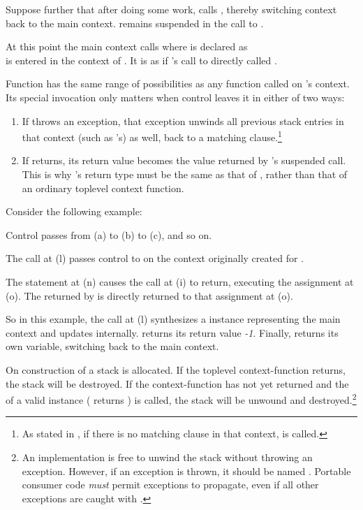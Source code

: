 Suppose further that after doing some work,  calls ,
thereby switching context back to the main context.  remains
suspended in the call to .

At this point the main context calls 
where  is declared as\\
  is entered in the context of . It is as if
's call to  directly called .

Function  has the same range of possibilities as any function called
on 's context. Its special invocation only matters when control
leaves it in either of two ways:

\begin{enumerate}
  \item If  throws an exception, that exception unwinds all previous
  stack entries in that context (such as 's) as well, back to a
  matching  clause.\footnote{As stated
  in , if there is no matching  clause
  in that context,  is called.}
  \item If  returns, its return value becomes the value returned
  by 's suspended  call. This is
  why 's return type must be the same as that of \op, rather than
  that of an ordinary toplevel context function.
\end{enumerate}

Consider the following example:


Control passes from (a) to (b) to (c), and so on.

The  call at (l) passes control
to  on the context originally created for .

The  statement at (n) causes the \op call at (i) to return,
executing the assignment at (o). The  returned by 
is directly returned to that assignment at (o).

So in this example, the call at (l) synthesizes a \ectx instance representing
the main context and updates  internally.  returns its
return value \emph{-1}. Finally,  returns its own 
variable, switching back to the main context.


\label{subsec:destruction}
On construction of  a stack is allocated. If the
toplevel context-function returns, the stack will be destroyed. If the
context-function has not yet returned and the  of
a valid  instance (\opbool
returns ) is called, the stack will be unwound and
destroyed.\footnote{An implementation is free to unwind the stack without
throwing an exception. However, if an exception is thrown, it should be
named . Portable consumer
code \emph{must} permit  exceptions to
propagate, even if all other exceptions are caught with .}

